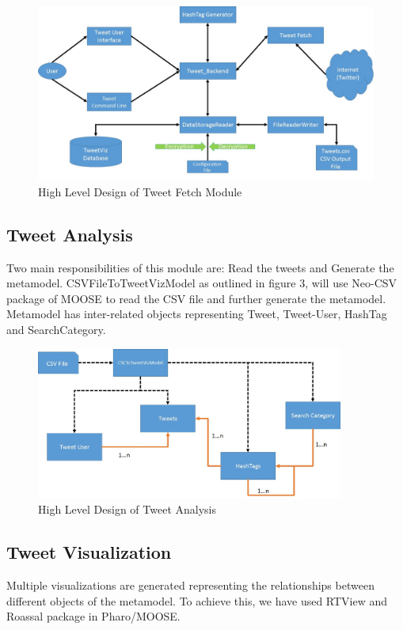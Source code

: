 \documentclass[11pt]{article}
\begin{document}
\begin{figure}[h]
\centering
\includegraphics[width=\textwidth]{TweetFetch.jpg}
\caption{High Level Design of Tweet Fetch Module}
\end{figure}


\subsection{Tweet Analysis}
Two main responsibilities of this module are: Read the tweets and Generate the metamodel. CSVFileToTweetVizModel as outlined in figure 3, will use Neo-CSV package of MOOSE to read the CSV file and further generate the metamodel. Metamodel has inter-related objects representing Tweet, Tweet-User, HashTag and SearchCategory. 


\begin{figure}[h]
\centering
\includegraphics[width=\textwidth, height=5cm]{TweetAnalysis.jpg}
\caption{High Level Design of Tweet Analysis}
\end{figure}

\subsection{Tweet Visualization}
Multiple visualizations are generated representing the relationships between different objects of the metamodel. To achieve this, we have used RTView and Roassal package in Pharo/MOOSE. 
\end{document}

